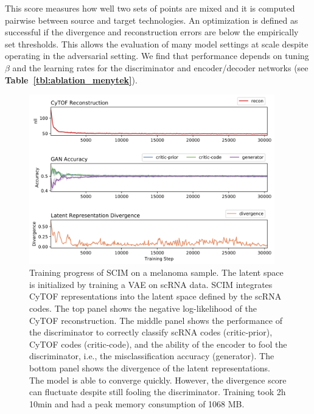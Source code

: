 This score measures how well two sets of points are mixed and it is computed pairwise between source and target technologies.
An optimization is defined as successful if the divergence and reconstruction errors are below the empirically set thresholds.
This allows the evaluation of many model settings at scale despite operating in the adversarial setting.
We find that performance depends on tuning $\beta$ and the learning rates for the discriminator and encoder/decoder networks (see \textbf{Table~\ref{tbl:ablation_menytek}}).

\begin{figure}[htbp]
    \centering
    \includegraphics[width=0.95\textwidth]{figures/integration/menytek-train-scores}
    \caption{
        Training progress of SCIM on a melanoma sample.
        The latent space is initialized by training a VAE on scRNA data.
        SCIM integrates CyTOF representations into the latent space
        defined by the scRNA codes.
        The top panel shows the negative log-likelihood of the CyTOF reconstruction.
        The middle panel shows the performance of the discriminator to correctly classify scRNA codes (critic-prior), CyTOF codes (critic-code), and the ability of the encoder to fool the discriminator, i.e., the misclassification accuracy (generator).
        The bottom panel shows the divergence of the latent representations.
        The model is able to converge quickly.
However, the divergence score can fluctuate despite still fooling the discriminator.
        Training took 2h 10min and had a peak memory consumption of 1068 MB.
    }
    \label{fig:tupro-train}
\end{figure}

